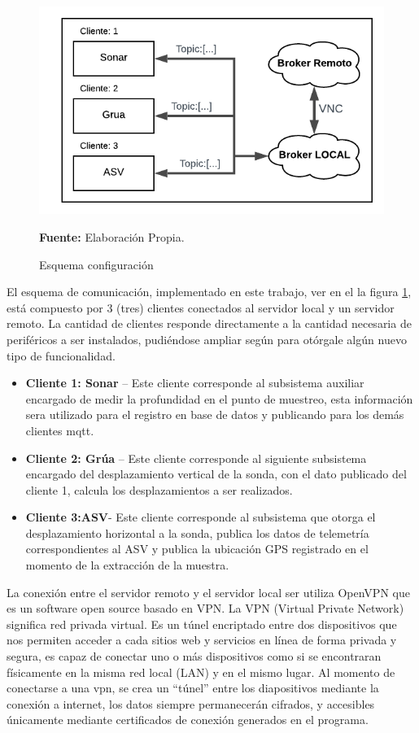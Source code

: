 \begin{figure}[ht]
        \centering
        \includegraphics[scale=0.6]{Imagenes/cap3/esquemaCom.png}
        \caption[mqtt2]{Esquema configuraci\'on}\textbf{Fuente:} Elaboración Propia.
        \label{fig:mqttUtil}
    \end{figure}

El esquema de comunicaci\'on, implementado en este trabajo, ver en el la figura \ref{fig:mqttUtil}, est\'a compuesto por 3 (tres) clientes conectados al servidor local y un servidor remoto. La cantidad de clientes responde directamente a la cantidad necesaria de perif\'ericos a ser instalados, pudi\'endose ampliar seg\'un para ot\'orgale alg\'un nuevo tipo de funcionalidad. 
\begin{itemize}
    \item \textbf{Cliente 1: Sonar} – Este cliente corresponde al subsistema auxiliar encargado de medir la profundidad en el punto de muestreo,  esta informaci\'on sera utilizado para el registro en base de datos y publicando para los dem\'as clientes mqtt.
    \item \textbf{Cliente 2: Gr\'ua} – Este cliente corresponde al siguiente subsistema encargado del desplazamiento vertical de la sonda, con el dato publicado del cliente 1, calcula los desplazamientos a ser realizados.
    \item \textbf{Cliente 3:ASV}- Este cliente corresponde al subsistema que otorga el desplazamiento horizontal a la sonda, publica los datos de telemetr\'ia correspondientes al ASV y publica la ubicaci\'on GPS registrado en el momento de la extracci\'on de la muestra.
\end{itemize}

La conexi\'on entre el servidor remoto y el servidor local ser utiliza OpenVPN que es un software open source basado en VPN. La VPN (Virtual Private Network) significa red privada virtual. Es un t\'unel encriptado entre dos dispositivos que nos permiten acceder a cada sitios web y servicios en línea de forma privada y segura, es capaz de conectar uno o más dispositivos como si se encontraran físicamente en la misma red local (LAN) y en el mismo lugar\cite{arora_131_nodate}. Al momento de conectarse a una vpn, se crea un “túnel” entre los diapositivos mediante la conexi\'on a internet, los datos siempre permanecerán cifrados, y accesibles \'unicamente mediante certificados de conexi\'on generados en el programa. 


